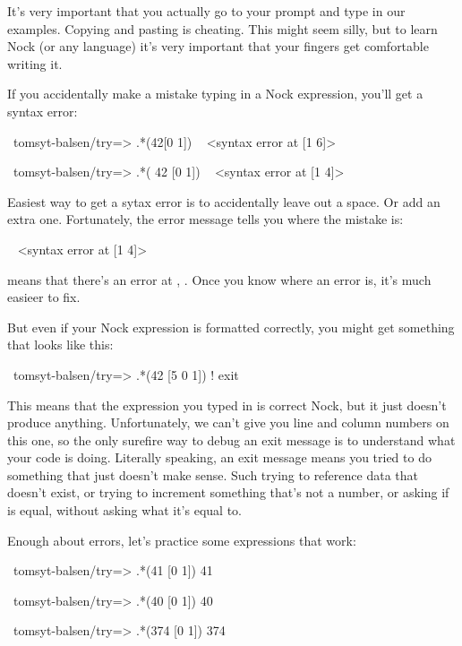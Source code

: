 It's very important that you actually go to your prompt and type in our
examples. Copying and pasting is cheating. This might seem silly, but to learn
Nock (or any language)  it's very important that your fingers get
comfortable writing it. 

If you accidentally make a mistake typing in a Nock expression, you'll get a
syntax error:

\begin{code}
~tomsyt-balsen/try=> .*(42[0 1]) 
~ <syntax error at [1 6]>

~tomsyt-balsen/try=> .*( 42 [0 1]) 
~ <syntax error at [1 4]>
\end{code}

Easiest way to get a sytax error is to accidentally leave out a space. Or add
an extra one. Fortunately, the error message tells you where the mistake is:

\begin{code}
~ <syntax error at [1 4]>
\end{code}

means that there's an error at , .  Once you know where an
error is, it's much easieer to fix.

But even if your Nock expression is formatted correctly, you might get
something that looks like this:

\begin{code}
~tomsyt-balsen/try=> .*(42 [5 0 1]) 
! exit
\end{code}
This means that the expression you typed in is correct Nock, but it just
doesn't produce anything. Unfortunately, we can't give you line and column
numbers on this one, so the only surefire way to debug an exit message is to
understand what your code is doing. Literally speaking, an exit message means
you tried to do something that just doesn't make sense. Such trying to
reference data that doesn't exist, or trying to increment something that's not
a number, or asking if  is equal, without asking what it's equal to.

Enough about errors, let's practice some expressions that work:

\begin{code}
~tomsyt-balsen/try=> .*(41 [0 1]) 
41

~tomsyt-balsen/try=> .*(40 [0 1]) 
40

~tomsyt-balsen/try=> .*(374 [0 1]) 
374
\end{code}

